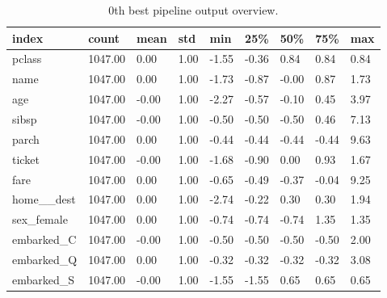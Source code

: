 \documentclass{article}%
\begin{document}
%


\begin{table}[H]%
\begin{center}%
\begin{tabular}{l l l l l l l l l}%
\hline%
\textbf{index}&\textbf{count}&\textbf{mean}&\textbf{std}&\textbf{min}&\textbf{25\%}&\textbf{50\%}&\textbf{75\%}&\textbf{max}\\%
\hline%
pclass&1047.00&0.00&1.00&{-}1.55&{-}0.36&0.84&0.84&0.84\\%
name&1047.00&0.00&1.00&{-}1.73&{-}0.87&{-}0.00&0.87&1.73\\%
age&1047.00&{-}0.00&1.00&{-}2.27&{-}0.57&{-}0.10&0.45&3.97\\%
sibsp&1047.00&{-}0.00&1.00&{-}0.50&{-}0.50&{-}0.50&0.46&7.13\\%
parch&1047.00&0.00&1.00&{-}0.44&{-}0.44&{-}0.44&{-}0.44&9.63\\%
ticket&1047.00&{-}0.00&1.00&{-}1.68&{-}0.90&0.00&0.93&1.67\\%
fare&1047.00&0.00&1.00&{-}0.65&{-}0.49&{-}0.37&{-}0.04&9.25\\%
home\_\_dest&1047.00&0.00&1.00&{-}2.74&{-}0.22&0.30&0.30&1.94\\%
sex\_female&1047.00&0.00&1.00&{-}0.74&{-}0.74&{-}0.74&1.35&1.35\\%
embarked\_C&1047.00&{-}0.00&1.00&{-}0.50&{-}0.50&{-}0.50&{-}0.50&2.00\\%
embarked\_Q&1047.00&0.00&1.00&{-}0.32&{-}0.32&{-}0.32&{-}0.32&3.08\\%
embarked\_S&1047.00&{-}0.00&1.00&{-}1.55&{-}1.55&0.65&0.65&0.65\\%
\hline%
\end{tabular}%
\end{center}%
\caption{0th best pipeline output overview.}%
\end{table}

%
\end{document}
